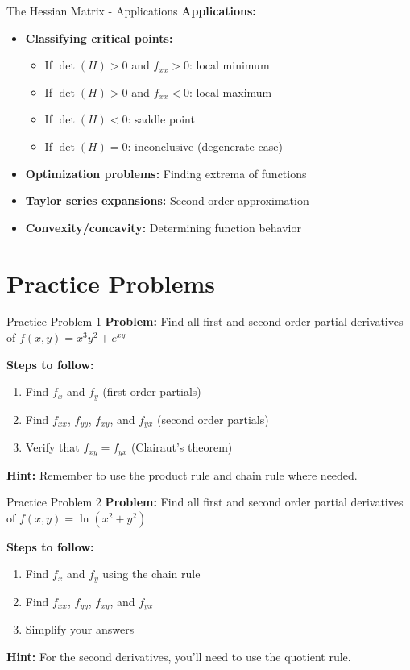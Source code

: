 \documentclass[aspectratio=169]{beamer}
\begin{document}
\begin{frame}{The Hessian Matrix - Applications}
\textbf{Applications:}
\begin{itemize}
    \item \textbf{Classifying critical points:}
    \begin{itemize}
        \item If $\det(H) > 0$ and $f_{xx} > 0$: local minimum
        \item If $\det(H) > 0$ and $f_{xx} < 0$: local maximum
        \item If $\det(H) < 0$: saddle point
        \item If $\det(H) = 0$: inconclusive (degenerate case)
    \end{itemize}
    \item \textbf{Optimization problems:} Finding extrema of functions
    \item \textbf{Taylor series expansions:} Second order approximation
    \item \textbf{Convexity/concavity:} Determining function behavior
\end{itemize}
\end{frame}

\section{Practice Problems}

\begin{frame}{Practice Problem 1}
\textbf{Problem:} Find all first and second order partial derivatives of $f(x,y) = x^3y^2 + e^{xy}$

\textbf{Steps to follow:}
\begin{enumerate}
    \item Find $f_x$ and $f_y$ (first order partials)
    \item Find $f_{xx}$, $f_{yy}$, $f_{xy}$, and $f_{yx}$ (second order partials)
    \item Verify that $f_{xy} = f_{yx}$ (Clairaut's theorem)
\end{enumerate}

\textbf{Hint:} Remember to use the product rule and chain rule where needed.
\end{frame}

\begin{frame}{Practice Problem 2}
\textbf{Problem:} Find all first and second order partial derivatives of $f(x,y) = \ln(x^2 + y^2)$

\textbf{Steps to follow:}
\begin{enumerate}
    \item Find $f_x$ and $f_y$ using the chain rule
    \item Find $f_{xx}$, $f_{yy}$, $f_{xy}$, and $f_{yx}$
    \item Simplify your answers
\end{enumerate}

\textbf{Hint:} For the second derivatives, you'll need to use the quotient rule.
\end{frame}
\end{document}

